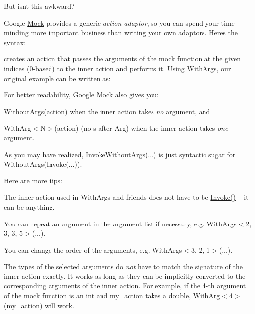 But isn\textquotesingle{}t this awkward?

Google \mbox{\hyperlink{classMock}{Mock}} provides a generic {\itshape action adaptor}, so you can spend your time minding more important business than writing your own adaptors. Here\textquotesingle{}s the syntax\+:


\begin{DoxyCode}{0}
\end{DoxyCode}


creates an action that passes the arguments of the mock function at the given indices (0-\/based) to the inner {\ttfamily action} and performs it. Using {\ttfamily With\+Args}, our original example can be written as\+:


\begin{DoxyCode}{0}
\end{DoxyCode}


For better readability, Google \mbox{\hyperlink{classMock}{Mock}} also gives you\+:


\begin{DoxyItemize}
\item {\ttfamily Without\+Args(action)} when the inner {\ttfamily action} takes {\itshape no} argument, and
\item {\ttfamily With\+Arg$<$N$>$(action)} (no {\ttfamily s} after {\ttfamily Arg}) when the inner {\ttfamily action} takes {\itshape one} argument.
\end{DoxyItemize}

As you may have realized, {\ttfamily Invoke\+Without\+Args(...)} is just syntactic sugar for {\ttfamily Without\+Args(\+Invoke(...))}.

Here are more tips\+:


\begin{DoxyItemize}
\item The inner action used in {\ttfamily With\+Args} and friends does not have to be {\ttfamily \mbox{\hyperlink{namespacetesting_a12aebaf8363d49a383047529f798b694}{Invoke()}}} -- it can be anything.
\item You can repeat an argument in the argument list if necessary, e.\+g. {\ttfamily With\+Args$<$2, 3, 3, 5$>$(...)}.
\item You can change the order of the arguments, e.\+g. {\ttfamily With\+Args$<$3, 2, 1$>$(...)}.
\item The types of the selected arguments do {\itshape not} have to match the signature of the inner action exactly. It works as long as they can be implicitly converted to the corresponding arguments of the inner action. For example, if the 4-\/th argument of the mock function is an {\ttfamily int} and {\ttfamily my\+\_\+action} takes a {\ttfamily double}, {\ttfamily With\+Arg$<$4$>$(my\+\_\+action)} will work.
\end{DoxyItemize}

